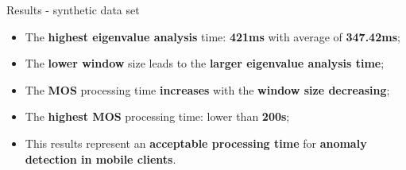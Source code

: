 \documentclass[newPxFont, numfooter, sectionpages]{beamer}
\begin{document}

\begin{frame}[c]{Results - synthetic data set}
	\begin{itemize}
		\item The \textbf{highest eigenvalue analysis} time: \textbf{421ms} with average of \textbf{347.42ms};
		\item The \textbf{lower window} size leads to the \textbf{larger eigenvalue analysis time};
		\item The \textbf{MOS} processing time \textbf{increases} with the \textbf{window size decreasing};
		\item The \textbf{highest MOS} processing time: lower than \textbf{200s};
		\item This results represent an \textbf{acceptable processing time} for \textbf{anomaly detection in mobile clients}.
	\end{itemize}
\end{frame}


\end{document}
